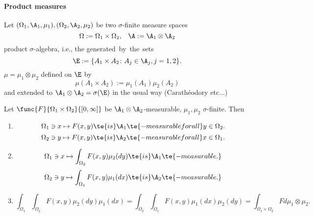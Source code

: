 \paragraph{Product measures}
	Let $(\Omega_1,\A_1,\mu_1),(\Omega_2,\A_2,\mu_2)$ be two $\sigma$-finite measure spaces
	\[\Omega:=\Omega_1\times\Omega_2,\;\;\;\A:=\A_1\otimes\A_2\]
	product $\sigma$-algebra, i.e., the \si generated by the sets
	\[\E:=\{A_1\times A_2\colon A_j\in\A_j,j=1,2\}.\]
	$\mu=\mu_1\otimes\mu_2$ defined on $\E$ by
	\[\mu(A_1\times A_2):=\mu_1(A_1)\mu_2(A_2)\]
	and extended to $\A_1\otimes\A_2=\sigma(\E)$ in the usual way (Carathéodory etc...)

\begin{thm}[Tonelli]\label{x.4}
	Let $\func{F}{\Omega_1\times\Omega_2}{[0,\infty]}$ be $\A_1\otimes\A_2$-measurable, $\mu_1,\mu_2$ $\sigma$-finite.
	Then
	\begin{enumerate}[label=\alph*)]
		\item \label{x.iv.a}\[\Omega_1\ni x\mapsto F(x,y)\te{ is }\A_1\te{-measurable for all }y\in\Omega_2.\]
		\[\Omega_2\ni y\mapsto F(x,y)\te{ is }\A_2\te{-measurable for all }x\in\Omega_1.\]
		\item \label{x.iv.b}\[\Omega_1\ni x\mapsto\int_{\Omega_2}F(x,y)\mu_2(dy)\te{ is }\A_1\te{-measurable.}\]
			\[\Omega_2\ni y\mapsto\int_{\Omega_1}F(x,y)\mu_1(dx)\te{ is }\A_2\te{-measurable.}\]
		\item \label{x.iv.c}	
			\[\int_{\Omega_1}\int_{\Omega_2}F(x,y)\mu_2(dy)\mu_1(dx)=\int_{\Omega_2}\int_{\Omega_1}F(x,y)\mu_1(dx)\mu_2(dy)=\int_{\Omega_1\times\Omega_2}Fd\mu_1\otimes\mu_2.\]
	\end{enumerate}
\end{thm}
